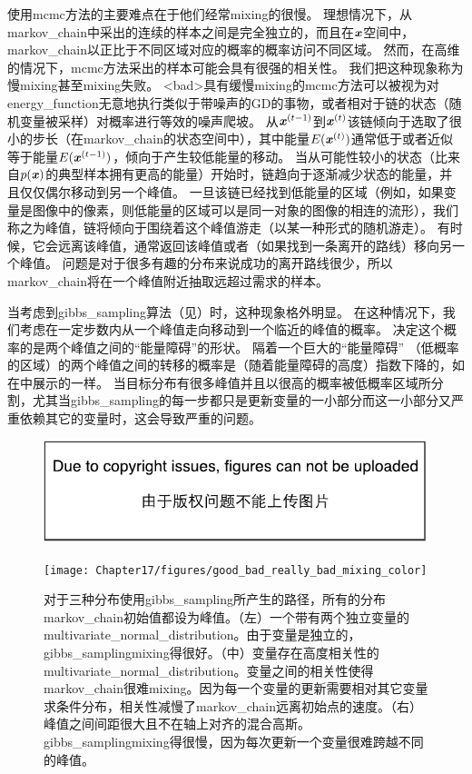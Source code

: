 使用\gls{mcmc}方法的主要难点在于他们经常\gls{mixing}的很慢。
理想情况下，从\gls{markov_chain}中采出的连续的样本之间是完全独立的，而且在$\boldsymbol{\mathit{x}}$空间中，\gls{markov_chain}以正比于不同区域对应的概率的概率访问不同区域。
然而，在高维的情况下，\gls{mcmc}方法采出的样本可能会具有很强的相关性。
我们把这种现象称为慢\gls{mixing}甚至\gls{mixing}失败。
<bad>具有缓慢\gls{mixing}的\gls{mcmc}方法可以被视为对\gls{energy_function}无意地执行类似于带噪声的\gls{GD}的事物，或者相对于链的状态（随机变量被采样）对概率进行等效的噪声爬坡。
从$\boldsymbol{\mathit{x}}^{(t-1)}$到$\boldsymbol{\mathit{x}}^{(t)}$该链倾向于选取了很小的步长（在\gls{markov_chain}的状态空间中），其中能量$E(\boldsymbol{\mathit{x}}^{(t)})$通常低于或者近似等于能量$E(\boldsymbol{\mathit{x}}^{(t-1)})$，倾向于产生较低能量的移动。
当从可能性较小的状态（比来自$p(\boldsymbol{\mathit{x}})$的典型样本拥有更高的能量）开始时，链趋向于逐渐减少状态的能量，并且仅仅偶尔移动到另一个峰值。
一旦该链已经找到低能量的区域（例如，如果变量是图像中的像素，则低能量的区域可以是同一对象的图像的相连的流形），我们称之为峰值，链将倾向于围绕着这个峰值游走（以某一种形式的随机游走）。
有时候，它会远离该峰值，通常返回该峰值或者（如果找到一条离开的路线）移向另一个峰值。
问题是对于很多有趣的分布来说成功的离开路线很少，所以\gls{markov_chain}将在一个峰值附近抽取远超过需求的样本。


当考虑到\gls{gibbs_sampling}算法（见）时，这种现象格外明显。
在这种情况下，我们考虑在一定步数内从一个峰值走向移动到一个临近的峰值的概率。
决定这个概率的是两个峰值之间的``能量障碍''的形状。
隔着一个巨大的``能量障碍'' （低概率的区域）的两个峰值之间的转移的概率是（随着能量障碍的高度）指数下降的，如在中展示的一样。
当目标分布有很多峰值并且以很高的概率被低概率区域所分割，尤其当\gls{gibbs_sampling}的每一步都只是更新变量的一小部分而这一小部分又严重依赖其它的变量时，这会导致严重的问题。


\begin{figure}[!htb]
\ifOpenSource
\centerline{\includegraphics{figure.pdf}}
\else
	\centerline{\texttt{[image: Chapter17/figures/good\_bad\_really\_bad\_mixing\_color]}}
\fi
	\caption{对于三种分布使用\gls{gibbs_sampling}所产生的路径，所有的分布\gls{markov_chain}初始值都设为峰值。（左）一个带有两个独立变量的\gls{multivariate_normal_distribution}。由于变量是独立的，\gls{gibbs_sampling}\gls{mixing}得很好。（中）变量存在高度相关性的\gls{multivariate_normal_distribution}。变量之间的相关性使得\gls{markov_chain}很难\gls{mixing}。因为每一个变量的更新需要相对其它变量求条件分布，相关性减慢了\gls{markov_chain}远离初始点的速度。（右）峰值之间间距很大且不在轴上对齐的混合高斯。\gls{gibbs_sampling}\gls{mixing}得很慢，因为每次更新一个变量很难跨越不同的峰值。}
	\label{fig:chap17_good_bad_really_bad_mixing_color}
\end{figure}


